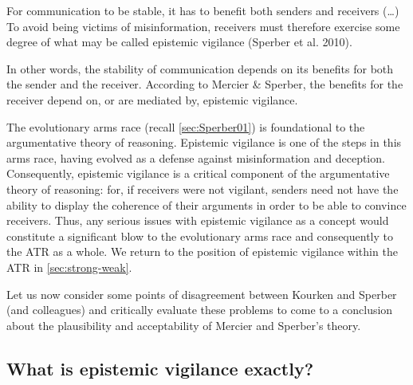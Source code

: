 \begin{quoting}
    For communication to be stable, it has to benefit both senders and receivers (\ldots) To avoid being victims of misinformation, receivers must therefore exercise some degree of what may be called epistemic vigilance (Sperber et al. 2010).
    \hfill \citep[p.~60]{MS11}
\end{quoting}
In other words, the stability of communication depends on its benefits for both the sender and the receiver. According to Mercier \& Sperber, the benefits for the receiver depend on, or are mediated by, epistemic vigilance.

The evolutionary arms race (recall \cref{sec:Sperber01}) is foundational to the argumentative theory of reasoning. Epistemic vigilance is one of the steps in this arms race, having evolved as a defense against misinformation and deception. Consequently, epistemic vigilance is a critical component of the argumentative theory of reasoning: for, if receivers were not vigilant, senders need not have the ability to display the coherence of their arguments in order to be able to convince receivers. Thus, any serious issues with epistemic vigilance as a concept would constitute a significant blow to the evolutionary arms race and consequently to the ATR as a whole. We return to the position of epistemic vigilance within the ATR in \cref{sec:strong-weak}.

Let us now consider some points of disagreement between Kourken \citet{Michaelian13} and Sperber (and colleagues) and critically evaluate these problems to come to a conclusion about the plausibility and acceptability of Mercier and Sperber's theory.

\subsection{What is epistemic vigilance exactly?}
\label{sec:EV-def}

